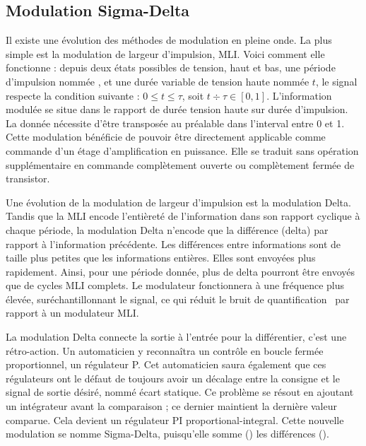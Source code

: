\documentclass[10pt, oneside, a4paper]{article}
\begin{document}
\subsection{Modulation Sigma-Delta}
\label{sec:sigmaDelta}
Il existe une évolution des méthodes de modulation en pleine onde.
La plus simple est la modulation de largeur d'impulsion, MLI.
Voici comment elle fonctionne : depuis deux états possibles de tension, haut et bas, une période d'impulsion nommée \tau{}, et une durée variable de tension haute nommée $t$, le signal respecte la condition suivante : $0 \leq t \leq \tau $, soit $t \div \tau \in [0,1]$.
L'information modulée se situe dans le rapport de durée tension haute sur durée d'impulsion.
La donnée nécessite d'être transposée au préalable dans l'interval entre 0 et 1.
Cette modulation bénéficie de pouvoir être directement applicable comme commande d'un étage d'amplification en puissance.
Elle se traduit sans opération supplémentaire en commande complètement ouverte ou complètement fermée de transistor.

Une évolution de la modulation de largeur d'impulsion est la modulation Delta.
Tandis que la MLI encode l'entièreté de l'information dans son rapport cyclique à chaque période, la modulation Delta n'encode que la différence (delta) par rapport à l'information précédente.
Les différences entre informations sont de taille plus petites que les informations entières.
Elles sont envoyées plus rapidement.
Ainsi, pour une période donnée, plus de delta pourront être envoyés que de cycles MLI complets.
Le modulateur fonctionnera à une fréquence plus élevée, suréchantillonnant le signal, ce qui réduit le bruit de quantification~\cite{gray1998quantization} par rapport à un modulateur MLI.

La modulation Delta connecte la sortie à l'entrée pour la différentier, c'est une rétro-action.
Un automaticien y reconnaîtra un contrôle en boucle fermée proportionnel, un régulateur P.
Cet automaticien saura également que ces régulateurs ont le défaut de toujours avoir un décalage entre la consigne et le signal de sortie désiré, nommé \og{}écart statique\fg{}.
Ce problème se résout en ajoutant un intégrateur avant la comparaison ; ce dernier maintient la dernière valeur comparue.
Cela devient un régulateur PI \og{}proportional-integral\fg{}.
Cette nouvelle modulation se nomme Sigma-Delta, puisqu'elle somme (\Sigma{}) les différences (\Delta{}).
\end{document}
